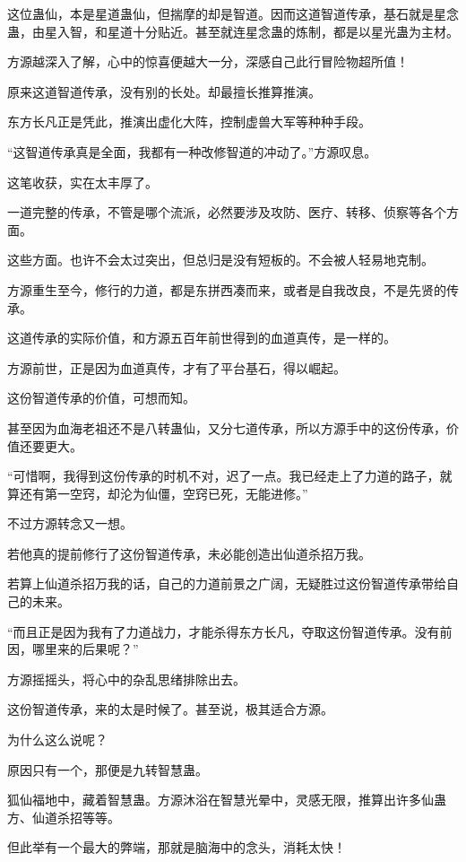 \begin{this_body}
这位蛊仙，本是星道蛊仙，但揣摩的却是智道。因而这道智道传承，基石就是星念蛊，由星入智，和星道十分贴近。甚至就连星念蛊的炼制，都是以星光蛊为主材。

方源越深入了解，心中的惊喜便越大一分，深感自己此行冒险物超所值！

原来这道智道传承，没有别的长处。却最擅长推算推演。

东方长凡正是凭此，推演出虚化大阵，控制虚兽大军等种种手段。

“这智道传承真是全面，我都有一种改修智道的冲动了。”方源叹息。

这笔收获，实在太丰厚了。

一道完整的传承，不管是哪个流派，必然要涉及攻防、医疗、转移、侦察等各个方面。

这些方面。也许不会太过突出，但总归是没有短板的。不会被人轻易地克制。

方源重生至今，修行的力道，都是东拼西凑而来，或者是自我改良，不是先贤的传承。

这道传承的实际价值，和方源五百年前世得到的血道真传，是一样的。

方源前世，正是因为血道真传，才有了平台基石，得以崛起。

这份智道传承的价值，可想而知。

甚至因为血海老祖还不是八转蛊仙，又分七道传承，所以方源手中的这份传承，价值还要更大。

“可惜啊，我得到这份传承的时机不对，迟了一点。我已经走上了力道的路子，就算还有第一空窍，却沦为仙僵，空窍已死，无能进修。”

不过方源转念又一想。

若他真的提前修行了这份智道传承，未必能创造出仙道杀招万我。

若算上仙道杀招万我的话，自己的力道前景之广阔，无疑胜过这份智道传承带给自己的未来。

“而且正是因为我有了力道战力，才能杀得东方长凡，夺取这份智道传承。没有前因，哪里来的后果呢？”

方源摇摇头，将心中的杂乱思绪排除出去。

这份智道传承，来的太是时候了。甚至说，极其适合方源。

为什么这么说呢？

原因只有一个，那便是九转智慧蛊。

狐仙福地中，藏着智慧蛊。方源沐浴在智慧光晕中，灵感无限，推算出许多仙蛊方、仙道杀招等等。

但此举有一个最大的弊端，那就是脑海中的念头，消耗太快！


\end{this_body}
